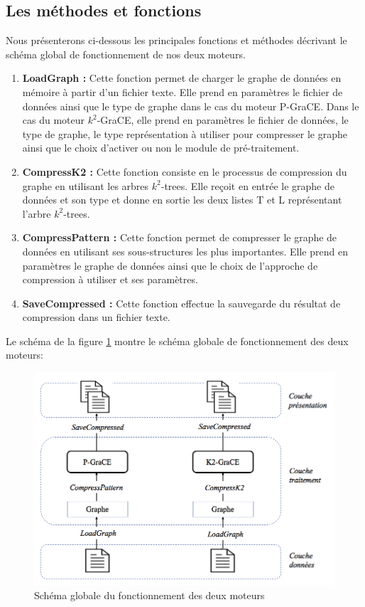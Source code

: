 \subsection{Les méthodes et fonctions }
	Nous présenterons ci-dessous les principales fonctions et méthodes décrivant le schéma global de fonctionnement de nos deux moteurs.
	
	\begin{enumerate}[label=(\alph*)]
		\item \textbf{LoadGraph :} Cette fonction permet de charger le graphe de données en mémoire à partir d'un fichier texte. Elle prend en paramètres le fichier de données ainsi que le type de graphe dans le cas du moteur P-GraCE. Dans le cas du moteur $k^2$-GraCE, elle prend en paramètres le fichier de données, le type de graphe, le type représentation à utiliser pour compresser le graphe ainsi que le choix d'activer ou non le module de pré-traitement.
		
		\item \textbf{CompressK2 :} Cette fonction consiste en le processus de compression du graphe en utilisant les arbres $k^2$-trees. Elle reçoit en entrée le graphe de données et son type et donne en sortie les deux listes T et L représentant l'arbre $k^2$-trees.
		
		\item \textbf{CompressPattern :} Cette fonction permet de compresser le graphe de données en utilisant ses sous-structures les plus importantes. Elle prend en paramètres le graphe de données ainsi que le choix de l'approche de compression à utiliser et ses paramètres.
		
		\item \textbf{SaveCompressed :}  Cette fonction effectue la sauvegarde du résultat de compression dans un fichier texte.
		
	\end{enumerate}	
	
	Le schéma de la figure \ref{Img:functMethod} montre le schéma globale de fonctionnement des deux moteurs:  
	
	\begin{figure}[H]
	
	
	\includegraphics[scale=0.5]{ressources/image/funct.png}
	\centering
	\caption{Schéma globale du fonctionnement des deux moteurs}
	\label{Img:functMethod}
 \end{figure}
	
